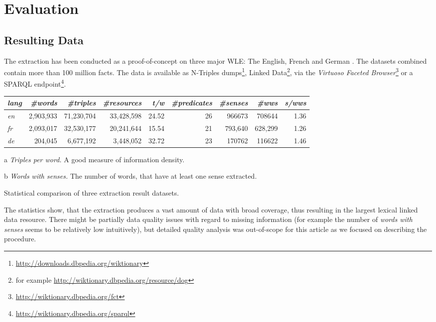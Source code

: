\section{Evaluation}
\label{sec:evaluation}
\subsection{Resulting Data}

The extraction has been conducted as a proof-of-concept on three major WLE:
The English, French and German \wik.
The datasets combined contain more than 100 million facts.
The data is available as N-Triples dumps\footnote{\url{http://downloads.dbpedia.org/wiktionary}}, Linked Data\footnote{for example \url{http://wiktionary.dbpedia.org/resource/dog}}, via the \emph{Virtuoso Faceted Browser}\footnote{\url{http://wiktionary.dbpedia.org/fct}} or a SPARQL endpoint\footnote{\url{http://wiktionary.dbpedia.org/sparql}}.

\begin{threeparttable} 
\begin{tabular}{|l|r|r|r|r|r|r|r|r|}
\hline \emph{lang} & \emph{\#words} & \emph{\#triples} & \emph{\#resources} & \emph{t/w}\tnote{a}\hspace{0.15cm} & \emph{\#predicates} & \emph{\#senses} & \emph{\#wws}\tnote{b}\hspace{0.15cm} & \emph{s/wws} \\ 
\hline \hline \textit{en} & 2,903,933 & 71,230,704 & 33,428,598 & 24.52 & 26 & 966673 & 708644 & 1.36 \\ 
\hline \textit{fr} & 2,093,017 & 32,530,177 & 20,241,644 & 15.54 & 21 & 793,640 & 628,299 & 1.26 \\ 
\hline \textit{de} & 204,045 & 6,677,192 & 3,448,052 & 32.72 & 23 & 170762 & 116622 & 1.46 \\ 
\hline 
\end{tabular}
\begin{tablenotes}\footnotesize 
\item[a] \textit{Triples per word.} A good measure of information density.
\item[b] \textit{Words with senses.} The number of words, that have at least one sense  extracted.
\end{tablenotes}
\caption{Statistical comparison of three \wik extraction result datasets.}
\end{threeparttable}

The statistics show, that the extraction produces a vast amount of data with broad coverage, thus resulting in the largest lexical linked data resource. 
There might be partially data quality issues with regard to missing information (for example the number of \textit{words with senses} seems to be relatively low intuitively), but detailed quality analysis was out-of-scope for this article as we focused on describing the procedure. 

